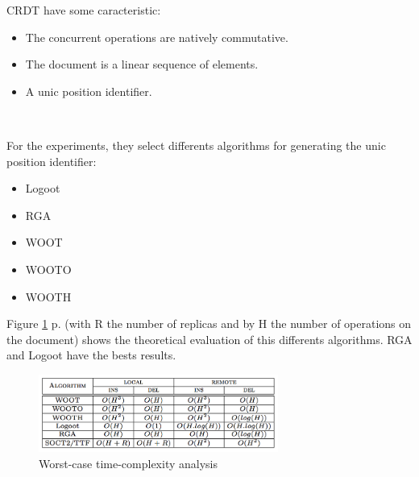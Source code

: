 CRDT have some caracteristic:
\begin{itemize}
	\item The concurrent operations are natively commutative.
	\item The document is a linear sequence of elements.
	\item A unic position identifier.
\end{itemize}~

For the experiments, they select differents algorithms for generating the unic position identifier:
\begin{itemize}
	\item Logoot
	\item RGA
	\item WOOT
	\item WOOTO
	\item WOOTH
\end{itemize}

Figure \ref{fig:worst} p.\pageref{fig:worst} (with R the number of replicas and by H the number of operations on the document) shows the theoretical evaluation of this differents algorithms. RGA and Logoot have the bests results.

\begin{figure}[h]
  \center
  \includegraphics[width=0.7\textwidth]{includes/worst.png}
  \caption{Worst-case time-complexity analysis}
  \label{fig:worst}
\end{figure}